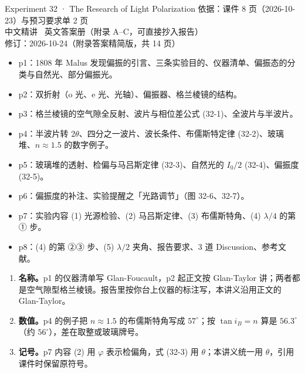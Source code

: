 \documentclass[11pt]{ctexart}
\begin{document}
{Experiment 32 · The Research of Light Polarization}
{依据：课件 8 页（2026-10-23）与预习要求单 2 页\\
中文精讲 \textperiodcentered\ 英文答案册（附录 A--C，可直接抄入报告）\\
修订：2026-10-24（附录答案精简版，共 14 页）}





\begin{itemize}
\item p1：1808 年 Malus 发现偏振的引言、三条实验目的、仪器清单、偏振态的分类与自然光、部分偏振光。
\item p2：双折射（o 光、e 光、光轴）、偏振器、格兰棱镜的结构。
\item p3：格兰棱镜的空气隙全反射、波片与相位差公式 (32-1)、全波片与半波片。
\item p4：半波片转 $2\theta$、四分之一波片、波长条件、布儒斯特定律 (32-2)、玻璃堆、$n\approx1.5$ 的数字例子。
\item p5：玻璃堆的透射、检偏与马吕斯定律 (32-3)、自然光的 $I_0/2$ (32-4)、偏振度 (32-5)。
\item p6：偏振度的补注、实验提醒之「光路调节」（图 32-6、32-7）。
\item p7：实验内容 (1) 光源检验、(2) 马吕斯定律、(3) 布儒斯特角、(4) $\lambda/4$ 的第 ① 步。
\item p8：(4) 的第 ②③ 步、(5) $\lambda/2$ 夹角、报告要求、3 道 Discussion、参考文献。
\end{itemize}



\begin{enumerate}
\item \textbf{名称。}p1 的仪器清单写 Glan-Foucault，p2 起正文按 Glan-Taylor 讲；两者都是空气隙型格兰棱镜。报告里按你台上仪器的标注写，本讲义沿用正文的 Glan-Taylor。
\item \textbf{数值。}p4 的例子把 $n\approx1.5$ 的布儒斯特角写成 $57^\circ$；按 $\tan i_B=n$ 算是 $56.3^\circ$（约 $56^\circ$），差在取整或玻璃牌号。
\item \textbf{记号。}p7 内容 (2) 用 $\varphi$ 表示检偏角，式 (32-3) 用 $\theta$；本讲义统一用 $\theta$，引用课件时保留原符号。
\end{enumerate}
\end{document}
